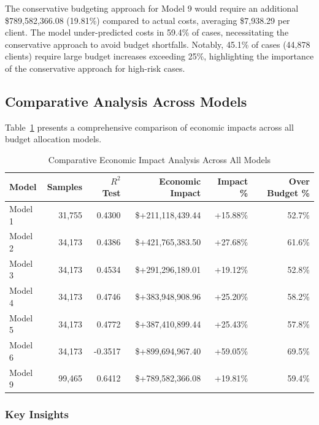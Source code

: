 The conservative budgeting approach for Model 9 would require an additional \$789,582,366.08 (19.81\%) compared to actual costs, averaging \$7,938.29 per client. The model under-predicted costs in 59.4\% of cases, necessitating the conservative approach to avoid budget shortfalls. Notably, 45.1\% of cases (44,878 clients) require large budget increases exceeding 25\%, highlighting the importance of the conservative approach for high-risk cases. 

\clearpage

\subsection{Comparative Analysis Across Models}
\label{subsec:comparative_impact}

Table~\ref{tab:all_models_impact_comparison} presents a comprehensive comparison of economic impacts across all budget allocation models.

\begin{table}[htbp]
\centering
\small
\caption{Comparative Economic Impact Analysis Across All Models}
\label{tab:all_models_impact_comparison}
\begin{tabular}{lrrrrr}
\toprule
\textbf{Model} & \textbf{Samples} & \textbf{$R^2$ Test} & \textbf{Economic Impact} & \textbf{Impact \%} & \textbf{Over Budget \%} \\
\midrule
Model 1 & 31,755 & 0.4300 & \$+211,118,439.44 & +15.88\% & 52.7\% \\
Model 2 & 34,173 & 0.4386 & \$+421,765,383.50 & +27.68\% & 61.6\% \\
Model 3 & 34,173 & 0.4534 & \$+291,296,189.01 & +19.12\% & 52.8\% \\
Model 4 & 34,173 & 0.4746 & \$+383,948,908.96 & +25.20\% & 58.2\% \\
Model 5 & 34,173 & 0.4772 & \$+387,410,899.44 & +25.43\% & 57.8\% \\
Model 6 & 34,173 & -0.3517 & \$+899,694,967.40 & +59.05\% & 69.5\% \\
Model 9 & 99,465 & 0.6412 & \$+789,582,366.08 & +19.81\% & 59.4\% \\
\bottomrule
\end{tabular}
\end{table}

\subsubsection{Key Insights}

